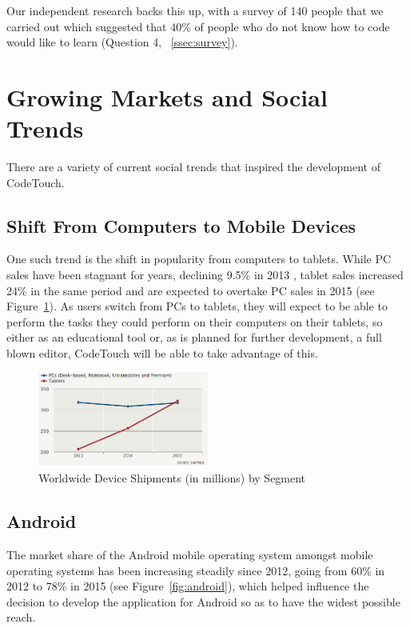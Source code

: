 \documentclass[ %
                    author={Jonathan Rankin},
                supervisor={Dr. David May, Dr. Ian Holyer},
                    degree={MEng},
                     title={CodeTouch},
                  subtitle={A Revolutionary Way To Program Real Code On Touch Screen Devices},
                      type={enterprise},
                      year={2015 } ]{dissertation}
\begin{document}
Our independent research backs this up, with a survey of 140 people that we carried out which suggested that 40\% of people who do not know how to code would like to learn (Question 4, ~\ref{ssec:survey}). 


\section{Growing Markets and Social Trends}
There are a variety of current social trends that inspired the development of CodeTouch.

\subsection{Shift From Computers to Mobile Devices}\label{ssec:shift}
One such trend is the shift in popularity from computers to tablets. While PC sales have been stagnant for years, declining 9.5\% in 2013 \cite{tabletOvertake}, tablet sales increased 24\% in the same period and are expected to overtake PC sales in 2015 \cite{tabletOvertake}(see Figure~\ref{fig:tabVsPC}). As users switch from PCs to tablets, they will expect to be able to perform the tasks they could perform on their computers on their tablets, so either as an educational tool or, as is planned for further development, a full blown editor, CodeTouch will be able to take advantage of this.
\begin{figure}[h]
\centering
\includegraphics[width=0.50\textwidth]{tabletVsPC}
\caption{Worldwide Device Shipments (in millions) by Segment \cite{tabletOvertake}}
\label{fig:tabVsPC}
\end{figure}



\subsection{Android}\label{sec:Android}
The market share of the Android mobile operating system amongst mobile operating systems has been increasing steadily since 2012, going from 60\% in 2012 to 78\% in 2015 (see Figure~\ref{fig:android}), which helped influence the decision to develop the application for Android so as to have the widest possible reach.
\end{document}
